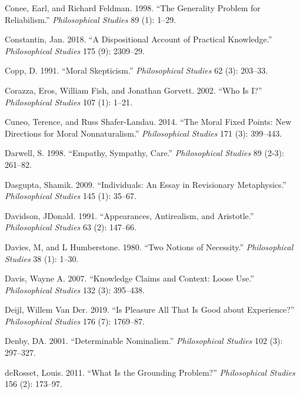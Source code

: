 \documentclass[
  10pt,
  letterpaper,
  DIV=11,
  numbers=noendperiod,
  twoside]{scrartcl}
\newlength{\cslhangindent}
\newenvironment{CSLReferences}[2] %
 {\begin{list}{}{%
  \setlength{\itemindent}{0pt}
  \setlength{\leftmargin}{0pt}
  \setlength{\parsep}{0pt}
  \ifodd #1
   \setlength{\leftmargin}{\cslhangindent}
   \setlength{\itemindent}{-1\cslhangindent}
  \fi
  \setlength{\itemsep}{#2\baselineskip}}}
 {\end{list}}
\begin{document}
\begin{CSLReferences}{1}{0}
Conee, Earl, and Richard Feldman. 1998. {``The Generality Problem for
Reliabilism.''} \emph{Philosophical Studies} 89 (1): 1--29.

Constantin, Jan. 2018. {``A Dispositional Account of Practical
Knowledge.''} \emph{Philosophical Studies} 175 (9): 2309--29.

Copp, D. 1991. {``Moral Skepticism.''} \emph{Philosophical Studies} 62
(3): 203--33.

Corazza, Eros, William Fish, and Jonathan Gorvett. 2002. {``Who Is
{I}?''} \emph{Philosophical Studies} 107 (1): 1--21.

Cuneo, Terence, and Russ Shafer-Landau. 2014. {``The Moral Fixed Points:
New Directions for Moral Nonnaturalism.''} \emph{Philosophical Studies}
171 (3): 399--443.

Darwell, S. 1998. {``Empathy, Sympathy, Care.''} \emph{Philosophical
Studies} 89 (2-3): 261--82.

Dasgupta, Shamik. 2009. {``Individuals: An Essay in Revisionary
Metaphysics.''} \emph{Philosophical Studies} 145 (1): 35--67.

Davidson, JDonald. 1991. {``Appearances, Antirealism, and Aristotle.''}
\emph{Philosophical Studies} 63 (2): 147--66.

Davies, M, and L Humberstone. 1980. {``Two Notions of Necessity.''}
\emph{Philosophical Studies} 38 (1): 1--30.

Davis, Wayne A. 2007. {``Knowledge Claims and Context: Loose Use.''}
\emph{Philosophical Studies} 132 (3): 395--438.

Deijl, Willem Van Der. 2019. {``Is Pleasure All That Is Good about
Experience?''} \emph{Philosophical Studies} 176 (7): 1769--87.

Denby, DA. 2001. {``Determinable Nominalism.''} \emph{Philosophical
Studies} 102 (3): 297--327.

deRosset, Louis. 2011. {``What Is the Grounding Problem?''}
\emph{Philosophical Studies} 156 (2): 173--97.


\end{CSLReferences}
\end{document}
